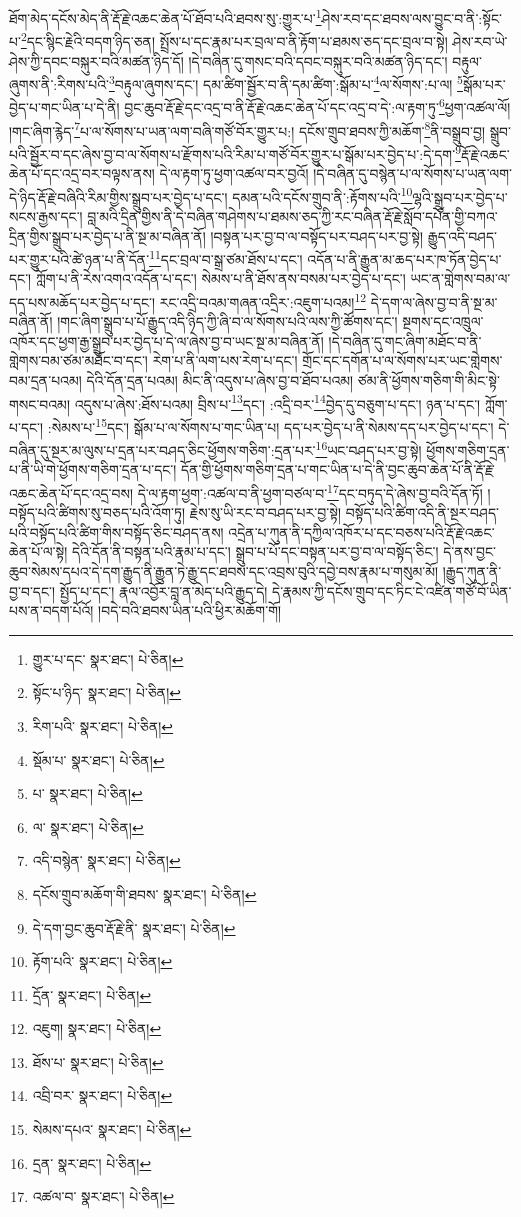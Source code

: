 ཐོག་མེད་དངོས་མེད་ནི་རྡོ་རྗེ་འཆང་ཆེན་པོ་ཐོབ་པའི་ཐབས་སུ་:གྱུར་པ་\footnote{གྱུར་པ་དང་  སྣར་ཐང་།  པེ་ཅིན། }ཤེས་རབ་དང་ཐབས་ལས་བྱུང་བ་ནི་:སྟོང་པ་\footnote{སྟོང་པ་ཉིད་  སྣར་ཐང་།  པེ་ཅིན། }དང་སྙིང་རྗེའི་བདག་ཉིད་ཅན། སྤྲོས་པ་དང་རྣམ་པར་བྲལ་བ་ནི་རྟོག་པ་ཐམས་ཅད་དང་བྲལ་བ་སྟེ། ཤེས་རབ་ཡེ་ཤེས་ཀྱི་དབང་བསྐུར་བའི་མཚན་ཉིད་དོ། །དེ་བཞིན་དུ་གསང་བའི་དབང་བསྐུར་བའི་མཚན་ཉིད་དང་། བརྟུལ་ཞུགས་ནི་:རིགས་པའི་\footnote{རིག་པའི་  སྣར་ཐང་།  པེ་ཅིན། }བརྟུལ་ཞུགས་དང་། དམ་ཚིག་སྦྱོར་བ་ནི་དམ་ཚིག་:སྒོམ་པ་\footnote{སྡོམ་པ་  སྣར་ཐང་།  པེ་ཅིན། }ལ་སོགས་:པ་ལ། \footnote{པ་  སྣར་ཐང་།  པེ་ཅིན། }སྒོམ་པར་བྱེད་པ་གང་ཡིན་པ་དེ་ནི། བྱང་ཆུབ་རྡོ་རྗེ་དང་འདྲ་བ་ནི་རྡོ་རྗེ་འཆང་ཆེན་པོ་དང་འདྲ་བ་དེ་:ལ་རྟག་ཏུ་\footnote{ལ་  སྣར་ཐང་།  པེ་ཅིན། }ཕྱག་འཚལ་ལོ། །གང་ཞིག་རྙེད་\footnote{འདི་བསྙེན་  སྣར་ཐང་།  པེ་ཅིན། }པ་ལ་སོགས་པ་ཡན་ལག་བཞི་གཙོ་བོར་གྱུར་པ:། དངོས་གྲུབ་ཐབས་ཀྱི་མཆོག་\footnote{དངོས་གྲུབ་མཆོག་གི་ཐབས་  སྣར་ཐང་།  པེ་ཅིན། }ནི་བསྒྲུབ་བྱ། སྒྲུབ་པའི་སྦྱོར་བ་དང་ཞེས་བྱ་བ་ལ་སོགས་པ་རྫོགས་པའི་རིམ་པ་གཙོ་བོར་གྱུར་པ་སྒོམ་པར་བྱེད་པ་:དེ་དག་\footnote{དེ་དག་བྱང་ཆུབ་རྡོ་རྗེ་ནི་  སྣར་ཐང་།  པེ་ཅིན། }རྡོ་རྗེ་འཆང་ཆེན་པོ་དང་འདྲ་བར་བལྟས་ནས། དེ་ལ་རྟག་ཏུ་ཕྱག་འཚལ་བར་བྱའོ། །དེ་བཞིན་དུ་བསྙེན་པ་ལ་སོགས་པ་ཡན་ལག་དེ་ཉིད་རྡོ་རྗེ་བཞིའི་རིམ་གྱིས་སྒྲུབ་པར་བྱེད་པ་དང་། དམན་པའི་དངོས་གྲུབ་ནི་:རྟོགས་པའི་\footnote{རྟོག་པའི་  སྣར་ཐང་།  པེ་ཅིན། }ལྷའི་སྒྲུབ་པར་བྱེད་པ་སངས་རྒྱས་དང་། བླ་མའི་དྲིན་གྱིས་ནི་དེ་བཞིན་གཤེགས་པ་ཐམས་ཅད་ཀྱི་རང་བཞིན་རྡོ་རྗེ་སློབ་དཔོན་གྱི་བཀའ་དྲིན་གྱིས་སྒྲུབ་པར་བྱེད་པ་ནི་སྔ་མ་བཞིན་ནོ། །བསྟན་པར་བྱ་བ་ལ་བསྟོད་པར་བཤད་པར་བྱ་སྟེ། རྒྱུད་འདི་བཤད་པར་གྱུར་པའི་ཚེ་ཉན་པ་ནི་དོན་\footnote{དྲོན་  སྣར་ཐང་།  པེ་ཅིན། }དང་བྲལ་བ་སྒྲ་ཙམ་ཐོས་པ་དང་། འདོན་པ་ནི་རྒྱུན་མ་ཆད་པར་ཁ་ཏོན་བྱེད་པ་དང་། ཀློག་པ་ནི་རེས་འགའ་འདོན་པ་དང་། སེམས་པ་ནི་ཐོས་ནས་བསམ་པར་བྱེད་པ་དང་། ཡང་ན་གླེགས་བམ་ལ་དད་པས་མཆོད་པར་བྱེད་པ་དང་། རང་འདྲི་བའམ་གཞན་འདྲིར་:འཇུག་པའམ།\footnote{འཇུག།  སྣར་ཐང་།  པེ་ཅིན། } དེ་དག་ལ་ཞེས་བྱ་བ་ནི་སྔ་མ་བཞིན་ནོ། །གང་ཞིག་སྒྲུབ་པ་པོ་རྒྱུད་འདི་ཉིད་ཀྱི་ཞི་བ་ལ་སོགས་པའི་ལས་ཀྱི་ཚོགས་དང་། སྔགས་དང་འཁྲུལ་འཁོར་དང་ཕྱག་རྒྱ་སྒྲུབ་པར་བྱེད་པ་དེ་ལ་ཞེས་བྱ་བ་ཡང་སྔ་མ་བཞིན་ནོ། །དེ་བཞིན་དུ་གང་ཞིག་མཐོང་བ་ནི་གླེགས་བམ་ཙམ་མཐོང་བ་དང་། རེག་པ་ནི་ལག་པས་རེག་པ་དང་། གྲོང་དང་དགོན་པ་ལ་སོགས་པར་ཡང་གླེགས་བམ་དྲན་པའམ། དེའི་དོན་དྲན་པའམ། མིང་ནི་འདུས་པ་ཞེས་བྱ་བ་ཐོབ་པའམ། ཙམ་ནི་ཕྱོགས་གཅིག་གི་མིང་སྟེ་གསང་བའམ། འདུས་པ་ཞེས་:ཐོས་པའམ། བྲིས་པ་\footnote{ཐོས་པ་  སྣར་ཐང་།  པེ་ཅིན། }དང་། :འདྲི་བར་\footnote{འབྲི་བར་  སྣར་ཐང་།  པེ་ཅིན། }བྱེད་དུ་བཅུག་པ་དང་། ཉན་པ་དང་། ཀློག་པ་དང་། :སེམས་པ་\footnote{སེམས་དཔའ་  སྣར་ཐང་།  པེ་ཅིན། }དང་། སྒོམ་པ་ལ་སོགས་པ་གང་ཡིན་པ། དད་པར་བྱེད་པ་ནི་སེམས་དད་པར་བྱེད་པ་དང་། དེ་བཞིན་དུ་སྔར་མ་ལུས་པ་དྲན་པར་བཤད་ཅིང་ཕྱོགས་གཅིག་:དྲན་པར་\footnote{དྲན་  སྣར་ཐང་།  པེ་ཅིན། }ཡང་བཤད་པར་བྱ་སྟེ། ཕྱོགས་གཅིག་དྲན་པ་ནི་ཡི་གེ་ཕྱོགས་གཅིག་དྲན་པ་དང་། དོན་གྱི་ཕྱོགས་གཅིག་དྲན་པ་གང་ཡིན་པ་དེ་ནི་བྱང་ཆུབ་ཆེན་པོ་ནི་རྡོ་རྗེ་འཆང་ཆེན་པོ་དང་འདྲ་བས། དེ་ལ་རྟག་ཕྱག་:འཚལ་བ་ནི་ཕྱག་བཙལ་བ་\footnote{འཚལ་བ་  སྣར་ཐང་།  པེ་ཅིན། }དང་བཏུད་དེ་ཞེས་བྱ་བའི་དོན་ཏོ། །བསྟོད་པའི་ཚིགས་སུ་བཅད་པའི་འོག་ཏུ། རྗེས་སུ་ཡི་རང་བ་བཤད་པར་བྱ་སྟེ། བསྟོད་པའི་ཚིག་འདི་ནི་སྔར་བཤད་པའི་བསྟོད་པའི་ཚིག་གིས་བསྟོད་ཅིང་བཤད་ནས། འདྲེན་པ་ཀུན་ནི་དཀྱིལ་འཁོར་པ་དང་བཅས་པའི་རྡོ་རྗེ་འཆང་ཆེན་པོ་ལ་སྟེ། དེའི་དོན་ནི་བསྟན་པའི་རྣམ་པ་དང་། སྒྲུབ་པ་པོ་དང་བསྟན་པར་བྱ་བ་ལ་བསྟོད་ཅིང་། དེ་ནས་བྱང་ཆུབ་སེམས་དཔའ་དེ་དག་རྒྱུད་ནི་རྒྱུན་ཏེ་རྒྱུ་དང་ཐབས་དང་འབྲས་བུའི་དབྱེ་བས་རྣམ་པ་གསུམ་མོ། །རྒྱུད་ཀུན་ནི་བྱ་བ་དང་། སྤྱོད་པ་དང་། རྣལ་འབྱོར་བླ་ན་མེད་པའི་རྒྱུད་དེ། དེ་རྣམས་ཀྱི་དངོས་གྲུབ་དང་ཏིང་ངེ་འཛིན་གཙོ་བོ་ཡིན་པས་ན་བདག་པོའོ། །བདེ་བའི་ཐབས་ཡིན་པའི་ཕྱིར་མཆོག་གོ། 